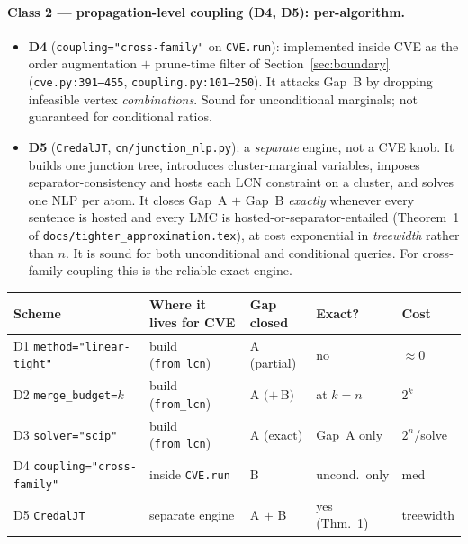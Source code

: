 \documentclass[11pt]{article}
\begin{document}
\paragraph{Class 2 --- propagation-level coupling (D4, D5): per-algorithm.}
\begin{itemize}
  \item \textbf{D4} (\texttt{coupling="cross-family"} on \texttt{CVE.run}): implemented inside CVE as
    the order augmentation $+$ prune-time filter of Section~\ref{sec:boundary}
    (\texttt{cve.py:391--455}, \texttt{coupling.py:101--250}). It attacks Gap~B by dropping infeasible
    vertex \emph{combinations}. Sound for unconditional marginals; not guaranteed for conditional
    ratios.
  \item \textbf{D5} (\texttt{CredalJT}, \texttt{cn/junction\_nlp.py}): a \emph{separate} engine, not a
    CVE knob. It builds one junction tree, introduces cluster-marginal variables, imposes
    separator-consistency and hosts each LCN constraint on a cluster, and solves one NLP per atom.
    It closes Gap~A $+$ Gap~B \emph{exactly} whenever every sentence is hosted and every LMC is
    hosted-or-separator-entailed (Theorem~1 of \texttt{docs/tighter\_approximation.tex}), at cost
    exponential in \emph{treewidth} rather than $n$. It is sound for both unconditional and
    conditional queries. For cross-family coupling this is the reliable exact engine.
\end{itemize}

\begin{center}\small
\begin{tabular}{lllll}
\toprule
Scheme & Where it lives for CVE & Gap closed & Exact? & Cost \\
\midrule
D1 \texttt{method="linear-tight"} & build (\texttt{from\_lcn}) & A (partial) & no & $\approx 0$ \\
D2 \texttt{merge\_budget=$k$}     & build (\texttt{from\_lcn}) & A $(+\,$B$)$ & at $k=n$ & $2^k$ \\
D3 \texttt{solver="scip"}         & build (\texttt{from\_lcn}) & A (exact)   & Gap~A only & $2^n$/solve \\
D4 \texttt{coupling="cross-family"} & inside \texttt{CVE.run}  & B           & uncond.\ only & med \\
D5 \texttt{CredalJT}              & separate engine           & A $+$ B     & yes (Thm.\ 1) & treewidth \\
\bottomrule
\end{tabular}
\end{center}
\end{document}
